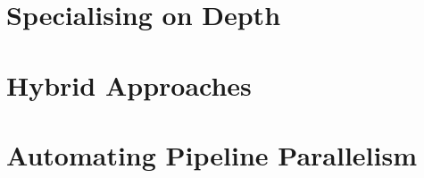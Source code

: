\documentclass[openright, dottedtoc, headinclude, footinclude=true, a4paper, numbers=noenddot]{scrreprt}
\begin{document}
        \section{Specialising on Depth}
        \label{sec:specialiseDepth}
        
    
        \section{Hybrid Approaches}
        \label{sec:hybrid}
        
    
        \section{Automating Pipeline Parallelism}
        \label{sec:autoPipe}
        
    
    
\end{document}
